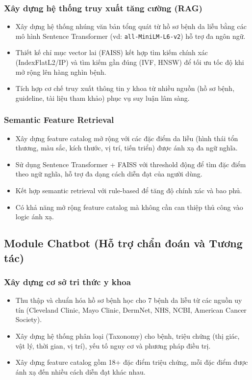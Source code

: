 \documentclass[12pt,a4paper]{article}
\begin{document}
\subsubsection{Xây dựng hệ thống truy xuất tăng cường (RAG)}
\begin{itemize}
    \item Xây dựng hệ thống nhúng văn bản tổng quát từ hồ sơ bệnh da liễu bằng các mô hình Sentence Transformer (vd: \texttt{all-MiniLM-L6-v2}) hỗ trợ đa ngôn ngữ.
    \item Thiết kế chỉ mục vector lai (FAISS) kết hợp tìm kiếm chính xác (IndexFlatL2/IP) và tìm kiếm gần đúng (IVF, HNSW) để tối ưu tốc độ khi mở rộng lên hàng nghìn bệnh.
    \item Tích hợp cơ chế truy xuất thông tin y khoa từ nhiều nguồn (hồ sơ bệnh, guideline, tài liệu tham khảo) phục vụ suy luận lâm sàng.
\end{itemize}

\subsubsection{Semantic Feature Retrieval}
\begin{itemize}
    \item Xây dựng feature catalog mở rộng với các đặc điểm da liễu (hình thái tổn thương, màu sắc, kích thước, vị trí, tiến triển) được ánh xạ đa ngữ nghĩa.
    \item Sử dụng Sentence Transformer + FAISS với threshold động để tìm đặc điểm theo ngữ nghĩa, hỗ trợ đa dạng cách diễn đạt của người dùng.
    \item Kết hợp semantic retrieval với rule-based để tăng độ chính xác và bao phủ.
    \item Có khả năng mở rộng feature catalog mà không cần can thiệp thủ công vào logic ánh xạ.
\end{itemize}

\subsection{Module Chatbot (Hỗ trợ chẩn đoán và Tương tác)}

\subsubsection{Xây dựng cơ sở tri thức y khoa}
\begin{itemize}
    \item Thu thập và chuẩn hóa hồ sơ bệnh học cho 7 bệnh da liễu từ các nguồn uy tín (Cleveland Clinic, Mayo Clinic, DermNet, NHS, NCBI, American Cancer Society).
    \item Xây dựng hệ thống phân loại (Taxonomy) cho bệnh, triệu chứng (thị giác, vật lý, thời gian, vị trí), yếu tố nguy cơ và phương pháp điều trị.
    \item Xây dựng feature catalog gồm 18+ đặc điểm triệu chứng, mỗi đặc điểm được ánh xạ đến nhiều cách diễn đạt khác nhau.
\end{itemize}
\end{document}
